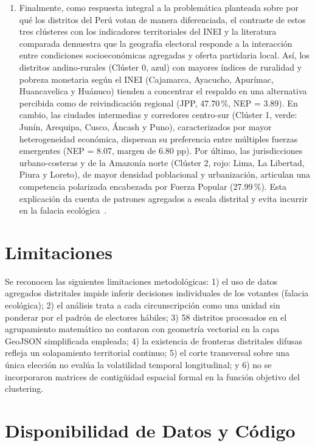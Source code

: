 \documentclass[conference,10pt,letterpaper]{IEEEtran}
\begin{document}
\begin{enumerate}
    \item Finalmente, como respuesta integral a la problemática planteada sobre por qué los distritos del Perú votan de manera diferenciada, el contraste de estos tres clústeres con los indicadores territoriales del INEI \cite{inei2025_pobreza} y la literatura comparada \cite{sulmont2018, quintanilla2020, encinas2021, zacharias2015} demuestra que la geografía electoral responde a la interacción entre condiciones socioeconómicas agregadas y oferta partidaria local. Así, los distritos andino-rurales (Clúster 0, azul) con mayores índices de ruralidad y pobreza monetaria según el INEI (Cajamarca, Ayacucho, Apurímac, Huancavelica y Huánuco) tienden a concentrar el respaldo en una alternativa percibida como de reivindicación regional (JPP, 47.70\,\%, NEP = 3.89). En cambio, las ciudades intermedias y corredores centro-sur (Clúster 1, verde: Junín, Arequipa, Cusco, Áncash y Puno), caracterizados por mayor heterogeneidad económica, dispersan su preferencia entre múltiples fuerzas emergentes (NEP = 8.07, margen de 6.80 pp). Por último, las jurisdicciones urbano-costeras y de la Amazonía norte (Clúster 2, rojo: Lima, La Libertad, Piura y Loreto), de mayor densidad poblacional y urbanización, articulan una competencia polarizada encabezada por Fuerza Popular (27.99\,\%). Esta explicación da cuenta de patrones agregados a escala distrital y evita incurrir en la falacia ecológica~\cite{zacharias2015}.
\end{enumerate}

\section{Limitaciones}

Se reconocen las siguientes limitaciones metodológicas: 1) el uso de datos agregados distritales impide inferir decisiones individuales de los votantes (falacia ecológica); 2) el análisis trata a cada circunscripción como una unidad sin ponderar por el padrón de electores hábiles; 3) 58 distritos procesados en el agrupamiento matemático no contaron con geometría vectorial en la capa GeoJSON simplificada empleada; 4) la existencia de fronteras distritales difusas refleja un solapamiento territorial continuo; 5) el corte transversal sobre una única elección no evalúa la volatilidad temporal longitudinal; y 6) no se incorporaron matrices de contigüidad espacial formal en la función objetivo del clustering.

\section*{Disponibilidad de Datos y Código}
\end{document}
